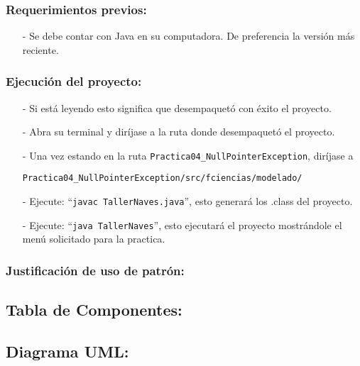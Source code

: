 \documentclass{article}
\newcommand{\code}[1]{\textcolor{white!25!black}{\texttt{#1}}}
\begin{document}
\subsubsection*{Requerimientos previos:}
\begin{itemize}
\item[-] Se debe contar con Java en su computadora. De preferencia la versión más reciente.
\end{itemize}

\subsubsection*{Ejecución del proyecto:}
\begin{itemize}
\item[-] Si está leyendo esto significa que desempaquetó con éxito el proyecto.
\item[-] Abra su terminal y diríjase a la ruta donde desempaquetó el proyecto.
\item[-] Una vez estando en la ruta \code{Practica04\_NullPointerException}, diríjase a

  \code{Practica04\_NullPointerException/src/fciencias/modelado/}
\item[-] Ejecute: “\code{javac TallerNaves.java}”, esto generará los .class del proyecto.
\item[-] Ejecute: “\code{java TallerNaves}”, esto ejecutará el proyecto mostrándole el menú solicitado para la practica.
\end{itemize}

\subsubsection*{Justificación de uso de patrón:}


\newpage
\subsection*{Tabla de Componentes:}


\newpage
\subsection*{Diagrama UML:}
\end{document}

